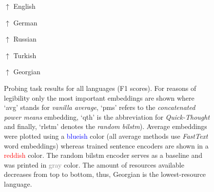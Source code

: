 \begin{figure}

\begin{center}
$\uparrow$ English
\end{center}

\begin{center}
$\uparrow$ German
\end{center}

\begin{center}
$\uparrow$ Russian
\end{center}

\begin{center}
$\uparrow$ Turkish
\end{center}

\begin{center}
$\uparrow$ Georgian
\end{center}
\caption[Probing task results for all languages (F1 scores)]{Probing task results for all languages (F1 scores). For reasons of legibility only the most important embeddings are shown where `avg' stands for \textit{vanilla average}, `pms' refers to the \textit{concatenated power means} embedding, `qth' is the abbreviation for \textit{Quick-Thought} and finally, `rlstm' denotes the \textit{random \gls{bilstm}}). Average embeddings were plotted using a \textcolor{blue}{blueish} color (all average methods use \textit{FastText} word embeddings) whereas trained sentence encoders are shown in a \textcolor{red}{reddish} color. The random \gls{bilstm} encoder serves as a baseline and was printed in \textcolor{gray}{gray} color. The amount of resources available decreases from top to bottom, thus, Georgian is the lowest-resource language.}
\label{fig:results_probing_tasks}
\end{figure}

